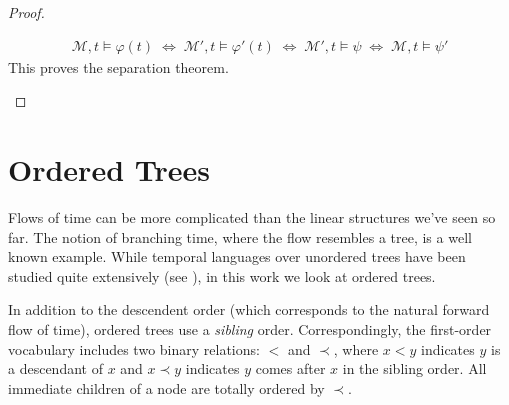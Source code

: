 \documentclass[a4paper,UKenglish,cleveref, autoref, thm-restate, numberwithinsect]{lipics-v2021}
\begin{document}
\begin{proof}
\begin{description}
        \begin{equation*}
            \begin{aligned}
                \mathcal{M}, t \vDash \varphi(t) \;\Longleftrightarrow\; \mathcal{M}', t \vDash \varphi'(t)
                \;\Longleftrightarrow\; \mathcal{M}', t \vDash \psi
                \;\Longleftrightarrow\; \mathcal{M}, t \vDash \psi'
            \end{aligned}
        \end{equation*}
        This proves the separation theorem.
    \end{description}
\end{proof}

\section{Ordered Trees}
\label{sec:ordered-trees}


Flows of time can be more complicated than the linear structures we've seen so far. The notion of branching time, where the flow resembles a tree, is a well known example. While temporal languages over unordered trees have been studied quite extensively (see \cite{RabinovichUnordered00}), in this work we look at ordered trees.

In addition to the descendent order (which corresponds to the natural forward flow of time), ordered trees use a \textit{sibling} order. Correspondingly, the first-order vocabulary includes two binary relations: $<$ and $\prec$, where $x < y$ indicates $y$ is a descendant of $x$ and $x \prec y$ indicates $y$ comes after $x$ in the sibling order. All immediate children of a node are totally ordered by $\prec$. %
\end{document}
